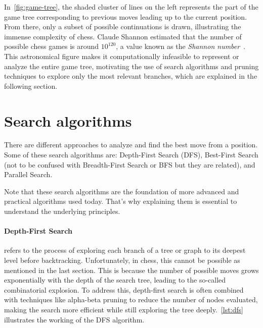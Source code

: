 \vspace{1em}

\noindent In~\cref{fig:game-tree}, the shaded cluster of lines on the left represents the part of the game tree corresponding to previous moves leading up to the current position. From there, only a subset of possible continuations is drawn, illustrating the immense complexity of chess. Claude Shannon estimated that the number of possible chess games is around $10^{120}$, a value known as the \textit{Shannon number}~\cite{Shannon1950}. This astronomical figure makes it computationally infeasible to represent or analyze the entire game tree, motivating the use of search algorithms and pruning techniques to explore only the most relevant branches, which are explained in the following section.

\section{Search algorithms}

There are different approaches to analyze and find the best move from a position. Some of these search algorithms are: Depth-First Search (DFS), Best-First Search (not to be confused with Breadth-First Search or BFS but they are related), and Parallel Search.

\vspace{1em}

\noindent Note that these search algorithms are the foundation of more advanced and practical algorithms used today. That's why explaining them is essential to understand the underlying principles.

\paragraph{Depth-First Search} refers to the process of exploring each branch of a tree or graph to its deepest level before backtracking. Unfortunately, in chess, this cannot be possible as mentioned in the last section. This is because the number of possible moves grows exponentially with the depth of the search tree, leading to the so-called combinatorial explosion. To address this, depth-first search is often combined with techniques like alpha-beta pruning to reduce the number of nodes evaluated, making the search more efficient while still exploring the tree deeply.~\cref{lst:dfs} illustrates the working of the DFS algorithm.

\vspace{1em}


